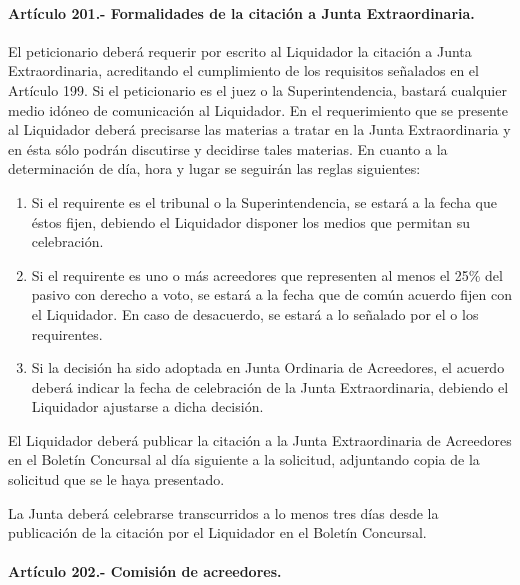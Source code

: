 \documentclass[
]{book}
\begin{document}
\hypertarget{artuxedculo-201.--formalidades-de-la-citaciuxf3n-a-junta-extraordinaria.}{%
\paragraph*{Artículo 201.- Formalidades de la citación a Junta Extraordinaria.}\label{artuxedculo-201.--formalidades-de-la-citaciuxf3n-a-junta-extraordinaria.}}

El peticionario deberá requerir por escrito al Liquidador la citación a Junta Extraordinaria, acreditando el cumplimiento de los requisitos señalados en el Artículo 199. Si el peticionario es el juez o la Superintendencia, bastará cualquier medio idóneo de comunicación al Liquidador. En el requerimiento que se presente al Liquidador deberá precisarse las materias a tratar en la Junta Extraordinaria y en ésta sólo podrán discutirse y decidirse tales materias. En cuanto a la determinación de día, hora y lugar se seguirán las reglas siguientes:

\begin{enumerate}
\def\labelenumi{\arabic{enumi})}
\item
  Si el requirente es el tribunal o la Superintendencia, se estará a la fecha que éstos fijen, debiendo el Liquidador disponer los medios que permitan su celebración.
\item
  Si el requirente es uno o más acreedores que representen al menos el 25\% del pasivo con derecho a voto, se estará a la fecha que de común acuerdo fijen con el Liquidador. En caso de desacuerdo, se estará a lo señalado por el o los requirentes.
\item
  Si la decisión ha sido adoptada en Junta Ordinaria de Acreedores, el acuerdo deberá indicar la fecha de celebración de la Junta Extraordinaria, debiendo el Liquidador ajustarse a dicha decisión.
\end{enumerate}

El Liquidador deberá publicar la citación a la Junta Extraordinaria de Acreedores en el Boletín Concursal al día siguiente a la solicitud, adjuntando copia de la solicitud que se le haya presentado.

La Junta deberá celebrarse transcurridos a lo menos tres días desde la publicación de la citación por el Liquidador en el Boletín Concursal.

\hypertarget{artuxedculo-202.--comisiuxf3n-de-acreedores.}{%
\paragraph*{Artículo 202.- Comisión de acreedores.}\label{artuxedculo-202.--comisiuxf3n-de-acreedores.}}
\end{document}
